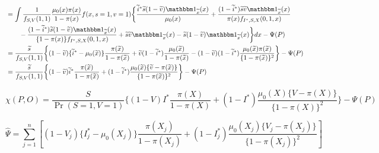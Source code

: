 \documentclass{article}
\begin{document}
\begin{align*}
   &= \int \dfrac{1}{f_{S,V}(1, 1)} \dfrac{\mu_0(x)\pi(x)}{1 - \pi(x)}f(x, s=1, v=1) \bigg\{\dfrac{\widetilde{i}^*\widetilde{s}(1-\widetilde{v})\mathbbm 1_{\widetilde{x}}(x)}{\mu_0(x)} + \dfrac{(1-\widetilde{i}^*)\widetilde{s}\widetilde{v}\mathbbm 1_{\widetilde{x}}(x)}{\pi(x) f_{I^*,S,X}(0, 1, x)} \\
   &\qquad - \dfrac{(1-\widetilde{i}^*)\widetilde{s}(1-\widetilde{v})\mathbbm 1_{\widetilde{x}}(x)}{\{1 - \pi(x)\} f_{I^*,S,X}(0, 1, x)} + \widetilde s \widetilde v \mathbbm 1_{\widetilde x}(x) - \widetilde s (1-\widetilde v) \mathbbm 1_{\widetilde x}(x)\bigg\} dx - \Psi(P) \\
   &=\dfrac{\widetilde s}{f_{S,V}(1, 1)}  \bigg\{(1 - \widetilde v)\{\widetilde i^* - \mu_0(\widetilde x)\}\dfrac{\pi(\widetilde x)}{1 - \pi(\widetilde x)} + \widetilde v (1 - \widetilde i^*) \dfrac{\mu_0(\widetilde x)}{1 - \pi(\widetilde x)} -  (1 - \widetilde v) (1 - \widetilde i^*)\dfrac{\mu_0(\widetilde x)\pi(\widetilde x)}{\{1 - \pi(\widetilde x)\}^2}  \bigg\}  - \Psi(P) \\
   &=\dfrac{\widetilde s}{f_{S,V}(1, 1)}  \bigg\{(1 - \widetilde v) \widetilde i^*\dfrac{\pi(\widetilde x)}{1 - \pi(\widetilde x)} + (1 - \widetilde i^*)\dfrac{\mu_0(\widetilde x)\{\widetilde v - \pi(\widetilde x)\}}{\{1 - \pi(\widetilde x)\}^2}  \bigg\}  - \Psi(P) 
\end{align*}

\begin{equation*}
    \chi(P, O) = \dfrac{S}{\Pr(S=1, V=1)}  \bigg\{(1 - V) I^*\dfrac{\pi(X)}{1 - \pi(X)} + (1 - I^*)\dfrac{\mu_0(X)\{V - \pi(X)\}}{\{1 - \pi(X)\}^2}  \bigg\}  - \Psi(P) 
\end{equation*}

\begin{equation*}
    \widehat{\Psi} = \sum_{j=1}^n \left[(1 - V_j) \{I^*_j - \mu_0(X_j)\}\dfrac{\pi(X_j)}{1 - \pi(X_j)} + (1 - I^*_j)\dfrac{\mu_0(X_j)\{V_j - \pi(X_j)\}}{\{1 - \pi(X_j)\}^2}\right]
\end{equation*}
\end{document}
